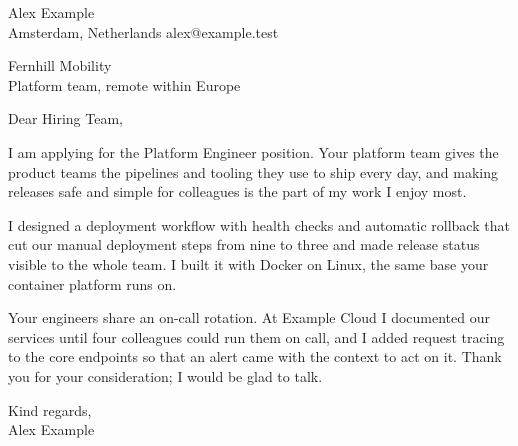 \documentclass[11pt,a4paper]{article}
\begin{document}
{\large Alex Example}\\
Amsterdam, Netherlands \textperiodcentered{} alex@example.test
\bigskip

Fernhill Mobility\\
Platform team, remote within Europe

Dear Hiring Team,

I am applying for the Platform Engineer position. Your platform team gives the
product teams the pipelines and tooling they use to ship every day, and making
releases safe and simple for colleagues is the part of my work I enjoy most.

I designed a deployment workflow with health checks and automatic rollback that
cut our manual deployment steps from nine to three and made release status
visible to the whole team. I built it with Docker on Linux, the same base your
container platform runs on.

Your engineers share an on-call rotation. At Example Cloud I documented our
services until four colleagues could run them on call, and I added request
tracing to the core endpoints so that an alert came with the context to act on
it. Thank you for your consideration; I would be glad to talk.

Kind regards,\\
Alex Example
\end{document}
